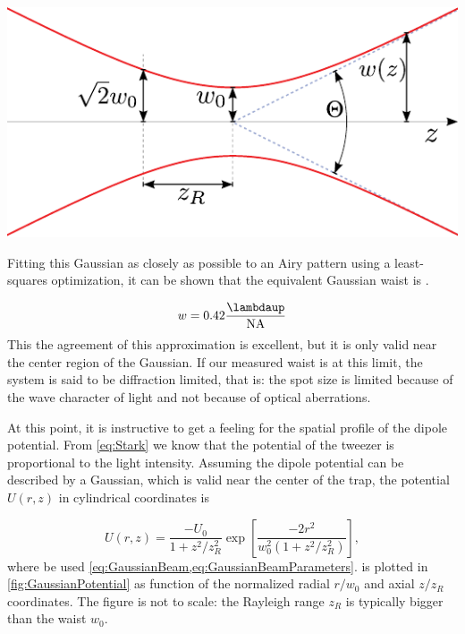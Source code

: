 \begin{mdframed}
    \vspace*{3mm}
    \centering
        \includegraphics[width=0.5\linewidth]{figures/GaussianBeam.pdf}
        \captionsetup{margin=0mm}%
        \label{fig:GaussianBeam}
\end{mdframed}

Fitting this Gaussian as closely as possible to an Airy pattern using a least-squares optimization, it can be shown that the equivalent Gaussian waist is \cite{Zhang2007}.

\begin{equation}\label{eq:GaussianAiryFit}
    w = 0.42 \frac{\lambdaup}{\text{NA}}
\end{equation}
This the agreement of this approximation is excellent, but it is only valid near the center region of the Gaussian. 
If our measured waist is at this limit, the system is said to be diffraction limited, that is: the spot size is limited because of the wave character of light and not because of optical aberrations. 

At this point, it is instructive to get a feeling for the spatial profile of the dipole potential.
From \cref{eq:Stark} we know that the potential of the tweezer is proportional to the light intensity. 
Assuming the dipole potential can be described by a Gaussian, which is valid \cite{Zhang2007} near the center of the trap, the potential $U(r,z)$ in cylindrical coordinates is

\begin{equation}\label{eq:GaussianPotential}
    U(r,z)=\frac{-U_{0}}{1+z^{2} / z_{R}^{2}} \exp \left[\frac{-2 r^{2}}{w_{0}^{2}\left(1+z^{2} / z_{R}^{2}\right)}\right],
\end{equation}
where be used \cref{eq:GaussianBeam,eq:GaussianBeamParameters}.
 is plotted in \cref{fig:GaussianPotential} as function of the normalized radial $r/w_0$ and axial $z/z_R$ coordinates. 
The figure is not to scale: the Rayleigh range $z_R$ is typically bigger than the waist $w_0$.

